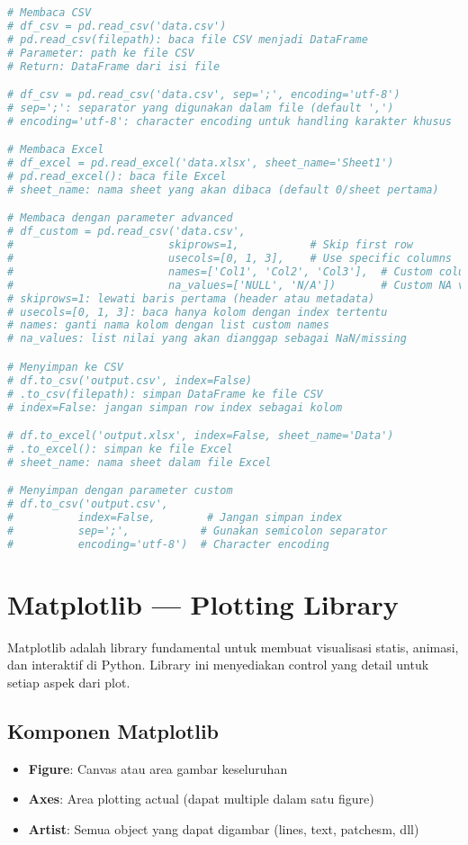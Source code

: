 \begin{lstlisting}[language=python, caption={Membaca dan Menulis File}, style=python]
# Membaca CSV
# df_csv = pd.read_csv('data.csv')
# pd.read_csv(filepath): baca file CSV menjadi DataFrame
# Parameter: path ke file CSV
# Return: DataFrame dari isi file

# df_csv = pd.read_csv('data.csv', sep=';', encoding='utf-8')
# sep=';': separator yang digunakan dalam file (default ',')
# encoding='utf-8': character encoding untuk handling karakter khusus

# Membaca Excel
# df_excel = pd.read_excel('data.xlsx', sheet_name='Sheet1')
# pd.read_excel(): baca file Excel
# sheet_name: nama sheet yang akan dibaca (default 0/sheet pertama)

# Membaca dengan parameter advanced
# df_custom = pd.read_csv('data.csv',
#                        skiprows=1,           # Skip first row
#                        usecols=[0, 1, 3],    # Use specific columns
#                        names=['Col1', 'Col2', 'Col3'],  # Custom column names
#                        na_values=['NULL', 'N/A'])       # Custom NA values
# skiprows=1: lewati baris pertama (header atau metadata)
# usecols=[0, 1, 3]: baca hanya kolom dengan index tertentu
# names: ganti nama kolom dengan list custom names
# na_values: list nilai yang akan dianggap sebagai NaN/missing

# Menyimpan ke CSV
# df.to_csv('output.csv', index=False)
# .to_csv(filepath): simpan DataFrame ke file CSV
# index=False: jangan simpan row index sebagai kolom

# df.to_excel('output.xlsx', index=False, sheet_name='Data')
# .to_excel(): simpan ke file Excel
# sheet_name: nama sheet dalam file Excel

# Menyimpan dengan parameter custom
# df.to_csv('output.csv',
#          index=False,        # Jangan simpan index
#          sep=';',           # Gunakan semicolon separator
#          encoding='utf-8')  # Character encoding
\end{lstlisting}

\section{Matplotlib — Plotting Library}

Matplotlib adalah library fundamental untuk membuat visualisasi statis, animasi, dan interaktif di Python. Library ini menyediakan control yang detail untuk setiap aspek dari plot.

\subsection*{Komponen Matplotlib}
\begin{itemize}
  \item \textbf{Figure}: Canvas atau area gambar keseluruhan
  \item \textbf{Axes}: Area plotting actual (dapat multiple dalam satu figure)
  \item \textbf{Artist}: Semua object yang dapat digambar (lines, text, patchesm, dll)
\end{itemize}

